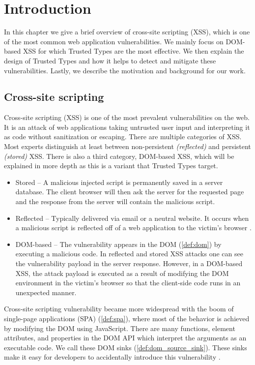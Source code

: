 \chapter{Introduction}
\label{chapter_intro}

In this chapter we give a brief overview of cross-site scripting (XSS), which is one of the most
common web application vulnerabilities. We mainly focus on DOM-based XSS for which Trusted Types are
the most effective. We then explain the design of Trusted Types and how it helps to detect and
mitigate these vulnerabilities. Lastly, we describe the motivation and background for our work.

\section{Cross-site scripting}

Cross-site scripting (XSS) is one of the most prevalent vulnerabilities on the web. It is an attack
of web applications taking untrusted user input and interpreting it as code without sanitization or
escaping. There are multiple categories of XSS. Most experts distinguish at least between
non-persistent \emph{(reflected)} and persistent \emph{(stored)} XSS. There is also a third
category, DOM-based XSS, which will be explained in more depth as this is a variant that Trusted
Types target.

\begin{itemize}
  \item  Stored -- A malicious injected script is permanently saved in a server database. The client
        browser will then ask the server for the requested page and the response from the server
        will contain the malicious script.
  \item  Reflected -- Typically delivered via email or a neutral website. It occurs when a
        malicious script is reflected off of a web application to the victim's browser
        \cite{reflected_xss}.
  \item  DOM-based -- The vulnerability appears in the DOM (\ref{def:dom}) by executing a malicious
        code. In reflected and stored XSS attacks one can see the vulnerability payload in the
        server response. However, in a DOM-based XSS, the attack payload is executed as a result of
        modifying the DOM environment in the victim's browser so that the client-side code runs in
        an unexpected manner.
\end{itemize}

Cross-site scripting vulnerability became more widespread with the boom of single-page applications
(SPA) (\ref{def:spa}), where most of the behavior is achieved by modifying the DOM using
JavaScript. There are many functions, element attributes, and properties in the DOM API which
interpret the arguments as an executable code. We call these DOM sinks (\ref{def:dom_source_sink}).
These sinks make it easy for developers to accidentally introduce this vulnerability
\cite{tt_web_framework_paper}.

